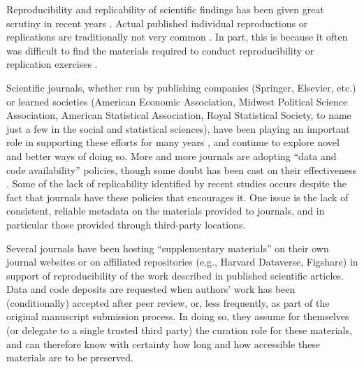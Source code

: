 Reproducibility and replicability of scientific findings has been given great scrutiny in recent years \parencite{CamererEvaluatingreplicabilitylaboratory2016,Collaboration2015-ev,Klein2014,FanelliOpinionsciencereally2018}.
%
Actual published individual reproductions or replications are traditionally not very common \parencite[in economics, see][]{BellMiller2013b,Duvendack2017}. In part, this is because it often was difficult to find the materials required to conduct reproducibility or replication exercises \parencite{Dewald1986,McCullough2006,McCullough03}.  

Scientific journals, whether run by publishing companies (Springer, Elsevier, etc.) or learned societies (American Economic Association, Midwest Political Science Association, American Statistical Association, Royal Statistical Society, to name just a few in the social and statistical sciences), have been playing an important role in supporting these efforts for many years \parencite{stodden_enhancing_2016}, and continue to explore novel and better ways of doing so. More and more journals are adopting ``data and code availability'' policies, though some doubt has been cast on their effectiveness \parencite{stodden_toward_2013,Stoddenempiricalanalysisjournal2018,Hoeffler2017}. Some of the lack of replicability identified by recent studies \parencite{Hoeffler2017a,Chang2017,ChangLi2015,CamererEvaluatingreplicabilitylaboratory2016,Stoddenempiricalanalysisjournal2018}  occurs despite the fact that journals have these policies that encourages it. One issue is the lack of consistent, reliable metadata on the materials provided to journals, and in particular those provided through third-party locations.

Several journals have been hosting ``supplementary materials'' on their own journal websites or on affiliated repositories (e.g., Harvard Dataverse, Figshare) in support of reproducibility of the work described in published scientific articles. Data and code deposits are requested when authors' work has been (conditionally) accepted after peer review, or, less frequently, as part of the original manuscript submission process. In doing so, they assume for themselves (or delegate to a single trusted third party) the curation role for these materials, and can therefore know with certainty how long and how accessible these materials are to be preserved.

